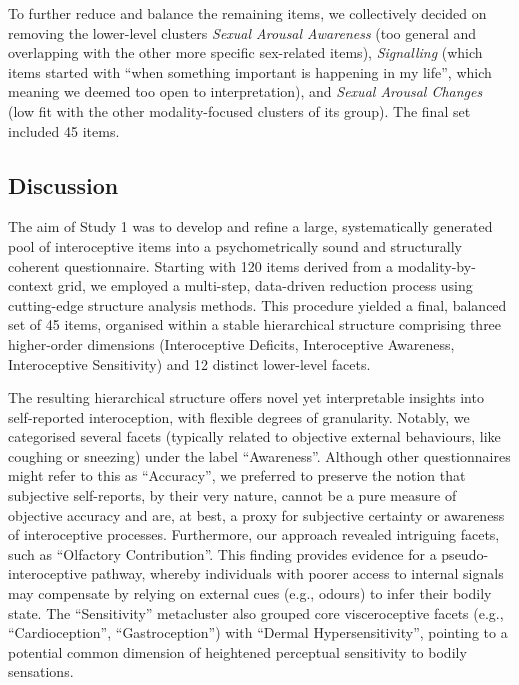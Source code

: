 \documentclass[
  man,
  floatsintext,
  longtable,
  nolmodern,
  notxfonts,
  notimes,
  mask,
  colorlinks=true,linkcolor=blue,citecolor=blue,urlcolor=blue]{apa7}
\begin{document}
To further reduce and balance the remaining items, we collectively
decided on removing the lower-level clusters \emph{Sexual Arousal
Awareness} (too general and overlapping with the other more specific
sex-related items), \emph{Signalling} (which items started with ``when
something important is happening in my life'', which meaning we deemed
too open to interpretation), and \emph{Sexual Arousal Changes} (low fit
with the other modality-focused clusters of its group). The final set
included 45 items.

\subsection{Discussion}\label{discussion}

The aim of Study 1 was to develop and refine a large, systematically
generated pool of interoceptive items into a psychometrically sound and
structurally coherent questionnaire. Starting with 120 items derived
from a modality-by-context grid, we employed a multi-step, data-driven
reduction process using cutting-edge structure analysis methods. This
procedure yielded a final, balanced set of 45 items, organised within a
stable hierarchical structure comprising three higher-order dimensions
(Interoceptive Deficits, Interoceptive Awareness, Interoceptive
Sensitivity) and 12 distinct lower-level facets.

The resulting hierarchical structure offers novel yet interpretable
insights into self-reported interoception, with flexible degrees of
granularity. Notably, we categorised several facets (typically related
to objective external behaviours, like coughing or sneezing) under the
label ``Awareness''. Although other questionnaires might refer to this
as ``Accuracy'', we preferred to preserve the notion that subjective
self-reports, by their very nature, cannot be a pure measure of
objective accuracy and are, at best, a proxy for subjective certainty or
awareness of interoceptive processes. Furthermore, our approach revealed
intriguing facets, such as ``Olfactory Contribution''. This finding
provides evidence for a pseudo-interoceptive pathway, whereby
individuals with poorer access to internal signals may compensate by
relying on external cues (e.g., odours) to infer their bodily state. The
``Sensitivity'' metacluster also grouped core visceroceptive facets
(e.g., ``Cardioception'', ``Gastroception'') with ``Dermal
Hypersensitivity'', pointing to a potential common dimension of
heightened perceptual sensitivity to bodily sensations.
\end{document}
